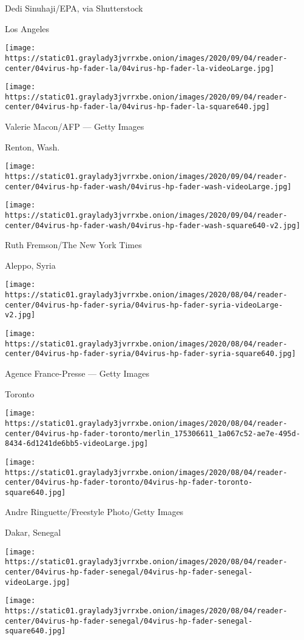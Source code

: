 Dedi Sinuhaji/EPA, via Shutterstock

Los Angeles

\texttt{[image: https://static01.graylady3jvrrxbe.onion/images/2020/09/04/reader-center/04virus-hp-fader-la/04virus-hp-fader-la-videoLarge.jpg]}

\texttt{[image: https://static01.graylady3jvrrxbe.onion/images/2020/09/04/reader-center/04virus-hp-fader-la/04virus-hp-fader-la-square640.jpg]}

Valerie Macon/AFP --- Getty Images

Renton, Wash.

\texttt{[image: https://static01.graylady3jvrrxbe.onion/images/2020/09/04/reader-center/04virus-hp-fader-wash/04virus-hp-fader-wash-videoLarge.jpg]}

\texttt{[image: https://static01.graylady3jvrrxbe.onion/images/2020/09/04/reader-center/04virus-hp-fader-wash/04virus-hp-fader-wash-square640-v2.jpg]}

Ruth Fremson/The New York Times

Aleppo, Syria

\texttt{[image: https://static01.graylady3jvrrxbe.onion/images/2020/08/04/reader-center/04virus-hp-fader-syria/04virus-hp-fader-syria-videoLarge-v2.jpg]}

\texttt{[image: https://static01.graylady3jvrrxbe.onion/images/2020/08/04/reader-center/04virus-hp-fader-syria/04virus-hp-fader-syria-square640.jpg]}

Agence France-Presse --- Getty Images

Toronto

\texttt{[image: https://static01.graylady3jvrrxbe.onion/images/2020/08/04/reader-center/04virus-hp-fader-toronto/merlin\_175306611\_1a067c52-ae7e-495d-8434-6d1241de6bb5-videoLarge.jpg]}

\texttt{[image: https://static01.graylady3jvrrxbe.onion/images/2020/08/04/reader-center/04virus-hp-fader-toronto/04virus-hp-fader-toronto-square640.jpg]}

Andre Ringuette/Freestyle Photo/Getty Images

Dakar, Senegal

\texttt{[image: https://static01.graylady3jvrrxbe.onion/images/2020/08/04/reader-center/04virus-hp-fader-senegal/04virus-hp-fader-senegal-videoLarge.jpg]}

\texttt{[image: https://static01.graylady3jvrrxbe.onion/images/2020/08/04/reader-center/04virus-hp-fader-senegal/04virus-hp-fader-senegal-square640.jpg]}

